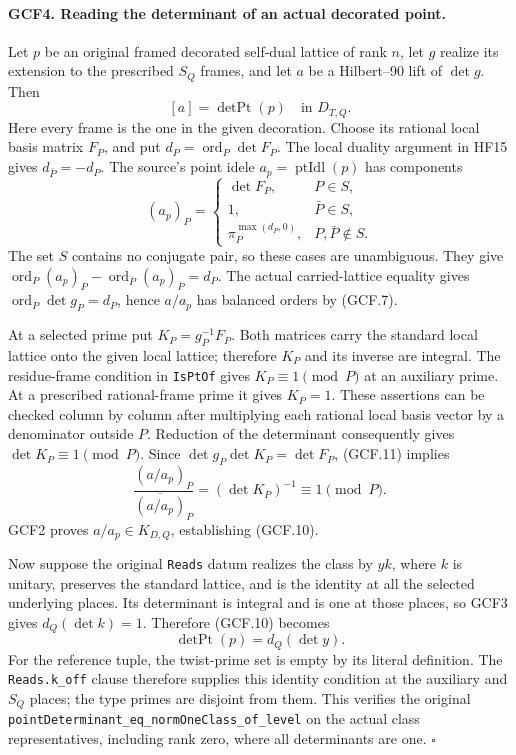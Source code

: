 \documentclass[11pt,a4paper]{article}
\numberwithin{equation}{section}
\theoremstyle{remark}\newtheorem{remark}[theorem]{Remark}
\begin{document}
\paragraph{GCF4. Reading the determinant of an actual decorated point.}
\label{claim:GCF4}
Let \(p\) be an original framed decorated self-dual lattice of rank
\(n\), let \(g\) realize its extension to the prescribed \(S_Q\)
frames, and let \(a\) be a Hilbert--90 lift of \(\det g\).  Then
\[
                         [a]=\operatorname{detPt}(p)
                                       \quad\text{in }D_{T,Q}.
 \tag{GCF.10}
\]
Here every frame is the one in the given decoration.  Choose its
rational local basis matrix \(F_P\), and put
\(d_P=\operatorname{ord}_P\det F_P\).  The local duality argument
in HF15 gives \(d_{\bar P}=-d_P\).  The source's point idele
\(a_p=\operatorname{ptIdl}(p)\) has components
\[
 (a_p)_P=
 \begin{cases}
    \det F_P,&P\in S,\\
    1,&\bar P\in S,\\
    \pi_P^{\max(d_P,0)},&P,\bar P\notin S.
 \end{cases}                                                   \tag{GCF.11}
\]
The set \(S\) contains no conjugate pair, so these cases are
unambiguous.  They give
\(\operatorname{ord}_P(a_p)_P-
\operatorname{ord}_{\bar P}(a_p)_{\bar P}=d_P\).
The actual carried-lattice equality gives
\(\operatorname{ord}_P\det g_P=d_P\), hence \(a/a_p\) has
balanced orders by (GCF.7).

At a selected prime put \(K_P=g_P^{-1}F_P\).  Both matrices carry
the standard local lattice onto the given local lattice; therefore
\(K_P\) and its inverse are integral.  The residue-frame condition
in \texttt{Is\allowbreak Pt\allowbreak Of} gives \(K_P\equiv1\pmod P\) at an auxiliary
prime.  At a prescribed rational-frame prime it gives \(K_P=1\).
These assertions can be checked column by column after multiplying
each rational local basis vector by a denominator outside \(P\).
Reduction of the determinant consequently gives
\(\det K_P\equiv1\pmod P\).  Since
\(\det g_P\det K_P=\det F_P\), (GCF.11) implies
\[
 \frac{(a/a_p)_P}{\overline{(a/a_p)}_P}
                 =(\det K_P)^{-1}\equiv1\pmod P.
\]
GCF2 proves \(a/a_p\in K_{D,Q}\), establishing (GCF.10).

Now suppose the original \texttt{Reads} datum realizes the class
by \(y k\), where \(k\) is unitary, preserves the standard lattice,
and is the identity at all the selected underlying places.  Its
determinant is integral and is one at those places, so GCF3 gives
\(d_Q(\det k)=1\).  Therefore (GCF.10) becomes
\[
                \operatorname{detPt}(p)=d_Q(\det y).
 \tag{GCF.12}
\]
For the reference tuple, the twist-prime set is empty by its literal
definition.  The \texttt{Reads.\allowbreak k\_\allowbreak off} clause therefore supplies this
identity condition at the auxiliary and \(S_Q\) places; the type
primes are disjoint from them.  This verifies the original
\texttt{point\allowbreak Determinant\_\allowbreak eq\_\allowbreak }\allowbreak\texttt{norm\allowbreak One\allowbreak Class\_\allowbreak of\_\allowbreak level} on the actual
class representatives, including rank zero, where all determinants
are one.
\hfill\(\square\)
\end{document}
